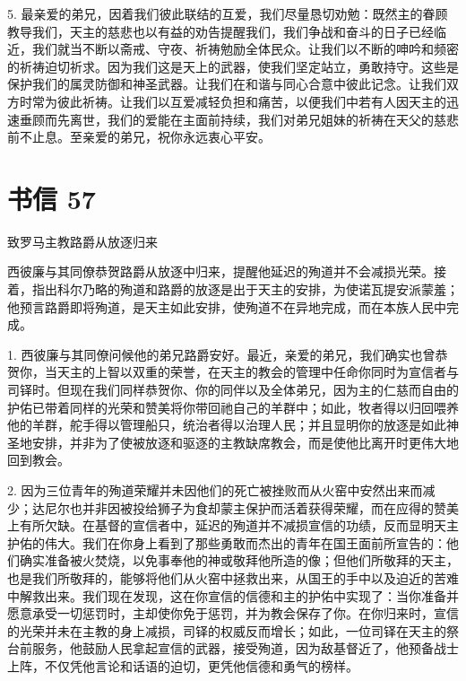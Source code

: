 5. 最亲爱的弟兄，因着我们彼此联结的互爱，我们尽量恳切劝勉：既然主的眷顾教导我们，天主的慈悲也以有益的劝告提醒我们，我们争战和奋斗的日子已经临近，我们就当不断以斋戒、守夜、祈祷勉励全体民众。让我们以不断的呻吟和频密的祈祷迫切祈求。因为我们这是天上的武器，使我们坚定站立，勇敢持守。这些是保护我们的属灵防御和神圣武器。让我们在和谐与同心合意中彼此记念。让我们双方时常为彼此祈祷。让我们以互爱减轻负担和痛苦，以便我们中若有人因天主的迅速垂顾而先离世，我们的爱能在主面前持续，我们对弟兄姐妹的祈祷在天父的慈悲前不止息。至亲爱的弟兄，祝你永远衷心平安。\par



\section{书信 57}

致罗马主教路爵\newline{}从放逐归来\par

西彼廉与其同僚恭贺路爵从放逐中归来，提醒他延迟的殉道并不会减损光荣。接着，指出科尔乃略的殉道和路爵的放逐是出于天主的安排，为使诺瓦提安派蒙羞；他预言路爵即将殉道，是天主如此安排，使殉道不在异地完成，而在本族人民中完成。\par

1. 西彼廉与其同僚问候他的弟兄路爵安好。最近，亲爱的弟兄，我们确实也曾恭贺你，当天主的上智以双重的荣誉，在天主的教会的管理中任命你同时为宣信者与司铎时。但现在我们同样恭贺你、你的同伴以及全体弟兄，因为主的仁慈而自由的护佑已带着同样的光荣和赞美将你带回祂自己的羊群中；如此，牧者得以归回喂养他的羊群，舵手得以管理船只，统治者得以治理人民；并且显明你的放逐是如此神圣地安排，并非为了使被放逐和驱逐的主教缺席教会，而是使他比离开时更伟大地回到教会。\par

2. 因为三位青年的殉道荣耀并未因他们的死亡被挫败而从火窑中安然出来而减少；达尼尔也并非因被投给狮子为食却蒙主保护而活着获得荣耀，而在应得的赞美上有所欠缺。在基督的宣信者中，延迟的殉道并不减损宣信的功绩，反而显明天主护佑的伟大。我们在你身上看到了那些勇敢而杰出的青年在国王面前所宣告的：他们确实准备被火焚烧，以免事奉他的神或敬拜他所造的像；但他们所敬拜的天主，也是我们所敬拜的，能够将他们从火窑中拯救出来，从国王的手中以及迫近的苦难中解救出来。我们现在发现，这在你宣信的信德和主的护佑中实现了：当你准备并愿意承受一切惩罚时，主却使你免于惩罚，并为教会保存了你。在你归来时，宣信的光荣并未在主教的身上减损，司铎的权威反而增长；如此，一位司铎在天主的祭台前服务，他鼓励人民拿起宣信的武器，接受殉道，因为敌基督近了，他预备战士上阵，不仅凭他言论和话语的迫切，更凭他信德和勇气的榜样。\par

